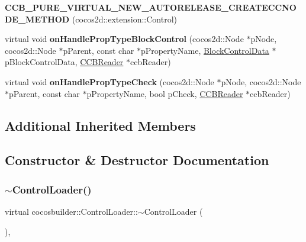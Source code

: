 \begin{DoxyCompactItemize}
{\bfseries C\+C\+B\+\_\+\+P\+U\+R\+E\+\_\+\+V\+I\+R\+T\+U\+A\+L\+\_\+\+N\+E\+W\+\_\+\+A\+U\+T\+O\+R\+E\+L\+E\+A\+S\+E\+\_\+\+C\+R\+E\+A\+T\+E\+C\+C\+N\+O\+D\+E\+\_\+\+M\+E\+T\+H\+OD} (cocos2d\+::extension\+::\+Control)
\item 
\mbox{\label{classcocosbuilder_1_1ControlLoader_aeadb93599b3813e5ada3f73604ef8563}} 
virtual void {\bfseries on\+Handle\+Prop\+Type\+Block\+Control} (cocos2d\+::\+Node $\ast$p\+Node, cocos2d\+::\+Node $\ast$p\+Parent, const char $\ast$p\+Property\+Name, \hyperlink{structcocosbuilder_1_1BlockControlData}{Block\+Control\+Data} $\ast$p\+Block\+Control\+Data, \hyperlink{classcocosbuilder_1_1CCBReader}{C\+C\+B\+Reader} $\ast$ccb\+Reader)
\item 
\mbox{\label{classcocosbuilder_1_1ControlLoader_aa2c413f88e88f803f293a34427732c94}} 
virtual void {\bfseries on\+Handle\+Prop\+Type\+Check} (cocos2d\+::\+Node $\ast$p\+Node, cocos2d\+::\+Node $\ast$p\+Parent, const char $\ast$p\+Property\+Name, bool p\+Check, \hyperlink{classcocosbuilder_1_1CCBReader}{C\+C\+B\+Reader} $\ast$ccb\+Reader)
\end{DoxyCompactItemize}
\subsection*{Additional Inherited Members}


\subsection{Constructor \& Destructor Documentation}
\mbox{\label{classcocosbuilder_1_1ControlLoader_adaea0700319b70e951a73dfb5b27c38e}} 
\subsubsection{\texorpdfstring{$\sim$\+Control\+Loader()}{~ControlLoader()}\hspace{0.1cm}{\footnotesize\ttfamily [1/2]}}
{\footnotesize\ttfamily virtual cocosbuilder\+::\+Control\+Loader\+::$\sim$\+Control\+Loader (\begin{DoxyParamCaption}{ }\end{DoxyParamCaption})\hspace{0.3cm}{\ttfamily [inline]}, {\ttfamily [virtual]}}

